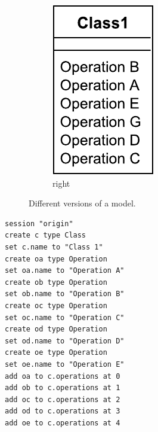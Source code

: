 \documentclass{llncs}
\begin{document}
\begin{minipage}[t]{0.59\linewidth}
\begin{figure}[H]
\begin{subfigure}[t]{0.2\linewidth}
    \includegraphics[width=\linewidth]{images/RightClassDiagram}
    \caption{right}
    \label{fig:right}
\end{subfigure}
\hfill
\label{fig:versions}
\caption{Different versions of a model.}
\end{figure}
\end{minipage}
\hfill
\begin{minipage}[t]{0.39\linewidth}
\begin{lstlisting}[style=eol,caption={The pseudo-formatted CBP of the model in Fig. \ref{fig:origin}.},label=lst:origincbp]
session "origin"
create c type Class
set c.name to "Class 1" 
create oa type Operation
set oa.name to "Operation A" 
create ob type Operation
set ob.name to "Operation B" 
create oc type Operation
set oc.name to "Operation C" 
create od type Operation
set od.name to "Operation D" 
create oe type Operation
set oe.name to "Operation E" 
add oa to c.operations at 0
add ob to c.operations at 1
add oc to c.operations at 2
add od to c.operations at 3
add oe to c.operations at 4
\end{lstlisting}
\end{minipage}
\end{document}
